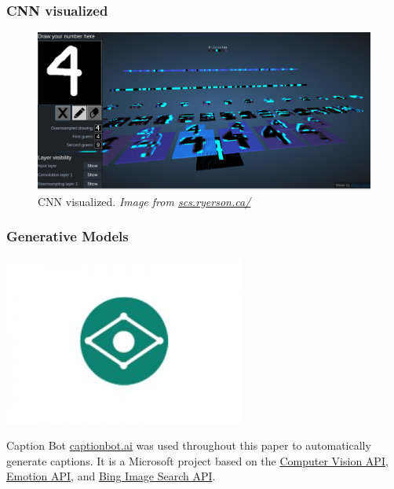 \documentclass[xcolor=dvipsnames]{beamer}
\begin{document}
		\begin{frame}
			\frametitle{CNN visualized}
			\begin{figure}
				\includegraphics[width=\textwidth]{images/cnn_visual.png}
				\centering
				\caption{CNN visualized. \textit{Image from \href{http://scs.ryerson.ca/~aharley/vis/conv/}{scs.ryerson.ca/}} \cite{harley2015isvc}}
			\end{figure}
			
		\end{frame}
	
		\begin{frame}
			\frametitle{Generative Models}
			\begin{center}
				\includegraphics[scale=.3]{images/captionbot.jpg}
			\end{center}
			\begin{block}{Caption Bot \cite{fang2015captions}}
				\href{https://www.captionbot.ai/}{captionbot.ai} was used throughout this paper to automatically generate captions. It is a Microsoft project based on the \href{https://azure.microsoft.com/en-us/services/cognitive-services/computer-vision/}{Computer Vision API}, \href{https://azure.microsoft.com/en-us/services/cognitive-services/emotion/}{Emotion API}, and \href{https://azure.microsoft.com/en-us/services/cognitive-services/bing-image-search-api/}{Bing Image Search API}.
			\end{block}
		\end{frame}
		
\end{document}
